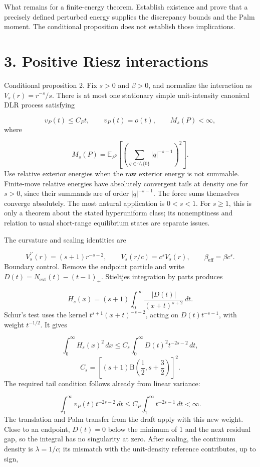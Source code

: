 \documentclass[11pt]{article}
\begin{document}
What remains for a finite-energy theorem. Establish existence and prove that a precisely defined perturbed energy supplies the discrepancy bounds and the Palm moment. The conditional proposition does not establish those implications.

\section*{3. Positive Riesz interactions}
Conditional proposition 2. Fix $s>0$ and $\beta>0$, and normalize the interaction as $V_s(r)=r^{-s}/s$. There is at most one stationary simple unit-intensity canonical DLR process satisfying

\[
v_P(t)\leq C_Pt,\qquad v_P(t)=o(t),\qquad M_s(P)<\infty,
\]
where

\[
M_s(P)=\mathbb E_{P^0}\left[\left(\sum_{q\in\gamma\setminus\{0\}}|q|^{-s-1}\right)^2\right].
\]
Use relative exterior energies when the raw exterior energy is not summable. Finite-move relative energies have absolutely convergent tails at density one for $s>0$, since their summands are of order $|q|^{-s-1}$. The force sums themselves converge absolutely. The most natural application is $0<s<1$. For $s\geq1$, this is only a theorem about the stated hyperuniform class; its nonemptiness and relation to usual short-range equilibrium states are separate issues.

The curvature and scaling identities are

\[
V_s^{\prime\prime}(r)=(s+1)r^{-s-2},\qquad V_s(r/c)=c^sV_s(r),\qquad \beta_{\mathrm{eff}}=\beta c^s.
\]
Boundary control. Remove the endpoint particle and write $D(t)=N_{\mathrm{ext}}(t)-(t-1)_+$. Stieltjes integration by parts produces

\[
H_s(x)=(s+1)\int_0^\infty\frac{|D(t)|}{(x+t)^{s+2}}\,dt.
\]
Schur's test uses the kernel $t^{s+1}(x+t)^{-s-2}$, acting on $D(t)t^{-s-1}$, with weight $t^{-1/2}$. It gives

\[
\int_0^\infty H_s(x)^2\,dx\leq C_s\int_0^\infty D(t)^2t^{-2s-2}\,dt,
\]
\[
C_s=\left[(s+1)\mathrm B\left(\frac12,s+\frac32\right)\right]^2.
\]
The required tail condition follows already from linear variance:

\[
\int_1^\infty v_P(t)t^{-2s-2}\,dt\leq C_P\int_1^\infty t^{-2s-1}\,dt<\infty.
\]
The translation and Palm transfer from the draft apply with this new weight. Close to an endpoint, $D(t)=0$ below the minimum of 1 and the next residual gap, so the integral has no singularity at zero. After scaling, the continuum density is $\lambda=1/c$; its mismatch with the unit-density reference contributes, up to sign,
\end{document}
